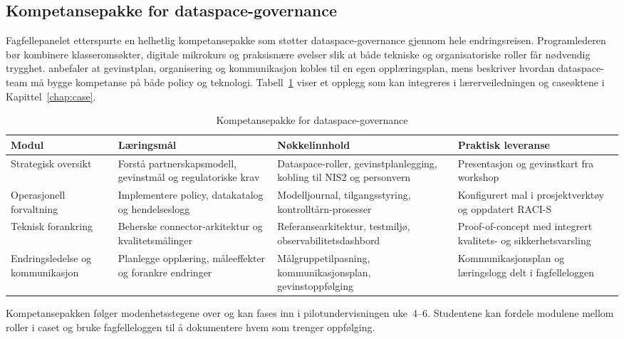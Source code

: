 \subsection*{Kompetansepakke for dataspace-governance}
Fagfellepanelet etterspurte en helhetlig kompetansepakke som støtter dataspace-governance gjennom hele endringsreisen. Programlederen bør kombinere klasseromsøkter, digitale mikrokurs og praksisnære øvelser slik at både tekniske og organisatoriske roller får nødvendig trygghet. \citet{digdir2022gevinst} anbefaler at gevinstplan, organisering og kommunikasjon kobles til en egen opplæringsplan, mens \citet{dssc2023skills} beskriver hvordan dataspace-team må bygge kompetanse på både policy og teknologi. Tabell~\ref{tab:kompetansepakke} viser et opplegg som kan integreres i lærerveiledningen og caseøktene i Kapittel~\ref{chap:case}.

\begin{table}[h]
    \centering
    \caption{Kompetansepakke for dataspace-governance}
    \label{tab:kompetansepakke}
    \begin{tabular}{p{2.7cm}p{4.0cm}p{3.6cm}p{3.2cm}}
        \toprule
        Modul & Læringsmål & Nøkkelinnhold & Praktisk leveranse \\
        \midrule
        Strategisk oversikt & Forstå partnerskapsmodell, gevinstmål og regulatoriske krav & Dataspace-roller, gevinstplanlegging, kobling til NIS2 og personvern & Presentasjon og gevinstkart fra workshop \\
        Operasjonell forvaltning & Implementere policy, datakatalog og hendelseslogg & Modelljournal, tilgangsstyring, kontrolltårn-prosesser & Konfigurert mal i prosjektverktøy og oppdatert RACI-S \\
        Teknisk forankring & Beherske connector-arkitektur og kvalitetsmålinger & Referansearkitektur, testmiljø, observabilitetsdashbord & Proof-of-concept med integrert kvalitets- og sikkerhetsvarsling \\
        Endringsledelse og kommunikasjon & Planlegge opplæring, måleeffekter og forankre endringer & Målgruppetilpasning, kommunikasjonsplan, gevinstoppfølging & Kommunikasjonsplan og læringslogg delt i fagfelleloggen \\
        \bottomrule
    \end{tabular}
\end{table}

Kompetansepakken følger modenhetsstegene over og kan fases inn i pilotundervisningen uke~4--6. Studentene kan fordele modulene mellom roller i caset og bruke fagfelleloggen til å dokumentere hvem som trenger oppfølging.

